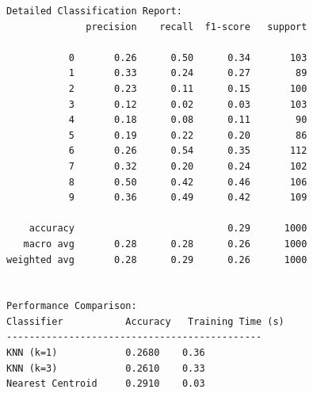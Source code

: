 \documentclass[lettersize,journal]{IEEEtran}
\begin{document}
\begin{verbatim}
Detailed Classification Report:
              precision    recall  f1-score   support

           0       0.26      0.50      0.34       103
           1       0.33      0.24      0.27        89
           2       0.23      0.11      0.15       100
           3       0.12      0.02      0.03       103
           4       0.18      0.08      0.11        90
           5       0.19      0.22      0.20        86
           6       0.26      0.54      0.35       112
           7       0.32      0.20      0.24       102
           8       0.50      0.42      0.46       106
           9       0.36      0.49      0.42       109

    accuracy                           0.29      1000
   macro avg       0.28      0.28      0.26      1000
weighted avg       0.28      0.29      0.26      1000


Performance Comparison:
Classifier           Accuracy   Training Time (s)
---------------------------------------------
KNN (k=1)            0.2680    0.36
KNN (k=3)            0.2610    0.33
Nearest Centroid     0.2910    0.03
\end{verbatim}

\vfill
\end{document}
